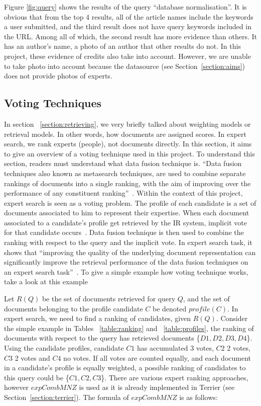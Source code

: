 Figure \ref{fig:query} shows the results of the query ``database normalisation''. It is obvious that from the top 4 results, all of the article names
include the keywords a user submitted, and the third result does not have query keywords included in the URL. Among all of which, the second result has more 
evidence than others. It has an author's name, a photo of an author that other results do not. In this project, these evidence of credits also take into account.
However, we are unable to take photo into account because the datasource (see Section~\ref{section:aims})
does not provide photos of experts.

\subsection{Voting Techniques}\label{section:voting}
In section ~\ref{section:retrieving}, we very briefly talked about weighting models or retrieval models. In other words, how documents are assigned scores. 
In expert search, we rank experts (people), not documents directly. In this section,
it aims to give an overview of a voting technique used in this project. To understand this section, readers must understand what data fusion technique is. 
``Data fusion techniques also known as metasearch techniques, are used to combine separate rankings of documents into a single ranking,
with the aim of improving over the performance of any constituent ranking''~\cite[P. 388]{expertsearch}. Within the context of this project, 
expert search is seen as a voting problem. The profile of each candidate is a set of documents associated to him to represent their expertise.
When each document associated to a candidate's profile get retrieved by the IR system, implicit vote for that candidate occurs~\cite[P. 389]{expertsearch}.
Data fusion technique is then used to combine the ranking with respect to the query and the implicit vote. In expert search task, it shows that 
``improving the quality of the underlying document representation can significantly improve the retrieval performance of the data fusion techniques 
on an expert search task''~\cite[P. 387]{expertsearch}. To give a simple example how voting technique works, take a look at this example

Let $R(Q)$ be the set of documents retrieved for query $Q$, and the set of documents belonging to the profile candidate $C$ be denoted $profile(C)$. In expert
search, we need to find a ranking of candidates, given $R(Q)$. Consider the simple example in Tables ~\ref{table:ranking} and ~\ref{table:profiles},
the ranking of documents with respect to the query has retrieved documents \{$D1, D2, D3, D4$\}. Using the candidate profiles, candidate $C1$ has accumulated
3 votes, $C2$ 2 votes, $C3$ 2 votes and $C4$ no votes. If all votes are counted equally, and each document in a candidate's profile is equally weighted, a possible
ranking of candidates to this query could be \{$C1, C2, C3$\}. 
There are various expert ranking approaches, however $expCombMNZ$ is used as it is already implemented in Terrier (see Section~\ref{section:terrier}).
The formula of $expCombMNZ$ is as follows:

